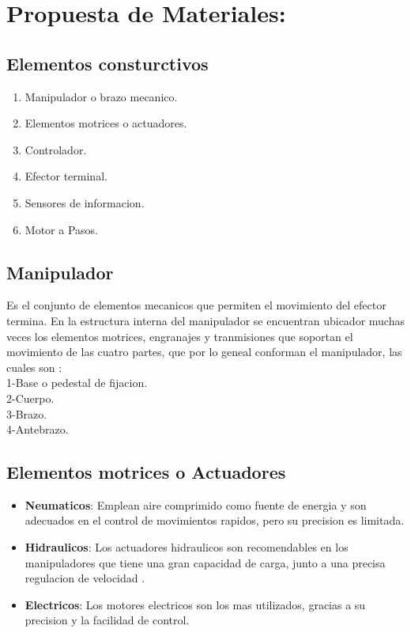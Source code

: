 \documentclass[14pt,a4paper]{article}
\begin{document}
\section{Propuesta de Materiales:}

\subsection{Elementos consturctivos}
\begin{enumerate}
\item Manipulador o brazo mecanico.
\item Elementos motrices o actuadores.
\item Controlador.
\item Efector terminal.
\item Sensores de informacion.
\item Motor a Pasos.
\end{enumerate}

\subsection{Manipulador}
Es el conjunto de elementos mecanicos que permiten el movimiento del efector termina. En la estructura interna del manipulador se encuentran ubicador muchas veces los elementos motrices, engranajes y tranmisiones que soportan el movimiento de las cuatro partes, que por lo geneal conforman el manipulador, las cuales son \citep{puglisi2006protesis}:\\
1-Base o pedestal de fijacion.\\
2-Cuerpo.\\
3-Brazo.\\
4-Antebrazo.\\
\subsection{Elementos motrices o Actuadores}

\begin{itemize}
\item \textbf{Neumaticos}:
Emplean aire comprimido como fuente de energia y son adecuados en el control de movimientos rapidos, pero su precision es limitada.\\
\item \textbf{Hidraulicos}:
Los actuadores hidraulicos son recomendables en los manipuladores que tiene una gran capacidad de carga, junto a una precisa regulacion de velocidad \citep{turiel2002aplicaciones} .\\
\item \textbf{Electricos}:
Los motores electricos son los mas utilizados, gracias a su precision y la facilidad de control.
\end{itemize}
\end{document}
